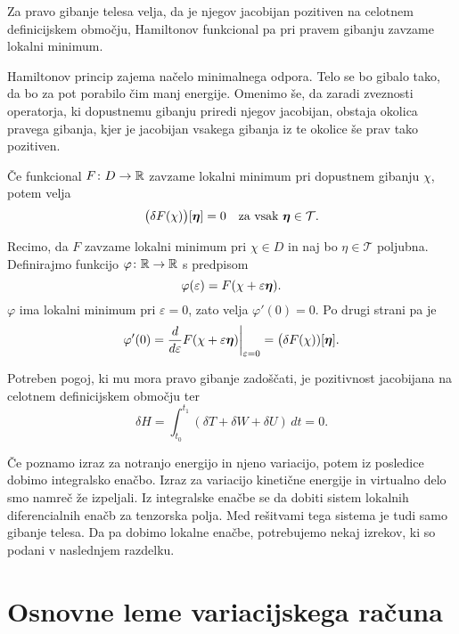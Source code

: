 \begin{aksiom}
	Za pravo gibanje telesa velja, da je njegov jacobijan pozitiven na
	celotnem definicijskem območju, Hamiltonov funkcional pa pri pravem gibanju
	zavzame lokalni minimum.
\end{aksiom}

Hamiltonov princip zajema načelo minimalnega odpora. Telo se bo gibalo tako, da
bo za pot porabilo čim manj energije. Omenimo še, da zaradi zveznosti operatorja,
ki dopustnemu gibanju priredi njegov jacobijan, obstaja okolica pravega gibanja,
kjer je jacobijan vsakega gibanja iz te okolice še prav tako pozitiven.

\begin{trditev}
	Če funkcional $F\colon D\to\mathbb R$ zavzame lokalni minimum pri dopustnem gibanju $\chi$, potem velja
	\[ \big(\delta F(\chi)\big)[\vek{\eta}]=0\quad\textrm{za vsak}\ \vek{\eta}\in\mathcal{T}. \]
\end{trditev}

\proof
	Recimo, da $F$ zavzame lokalni minimum pri $\chi\in D$ in naj bo $\eta\in\mathcal{T}$ poljubna.
	Definirajmo funkcijo $\varphi\colon\mathbb R\to\mathbb R$ s predpisom
	\[ \varphi(\varepsilon)=F(\chi+\varepsilon\boldsymbol \eta). \]
	$\varphi$ ima lokalni minimum pri $\varepsilon=0$, zato velja $\varphi'(0)=0.$
	Po drugi strani pa je
	\[
		\varphi'(0)=\at{\frac{d}{d\varepsilon}F(\chi+\varepsilon\vek{\eta})}{\varepsilon=0}=
		\big(\delta F(\chi))[\vek{\eta}].
	\]
\endproof

\begin{posledica}
	Potreben pogoj, ki mu mora pravo gibanje zadoščati, je pozitivnost jacobijana
	na celotnem definicijskem območju ter
	\[ \delta H = \int_{t_0}^{t_1}(\delta T+\delta W+\delta U)\,dt = 0. \]
\end{posledica}

Če poznamo izraz za notranjo energijo in njeno variacijo, potem iz posledice
dobimo integralsko enačbo. Izraz za variacijo kinetične energije in virtualno delo 
smo namreč že izpeljali. Iz integralske enačbe se da dobiti sistem lokalnih diferencialnih enačb
za tenzorska polja. Med rešitvami tega sistema je tudi samo gibanje telesa.
Da pa dobimo lokalne enačbe, potrebujemo nekaj izrekov, ki so podani v naslednjem razdelku.


\section{Osnovne leme variacijskega računa}



